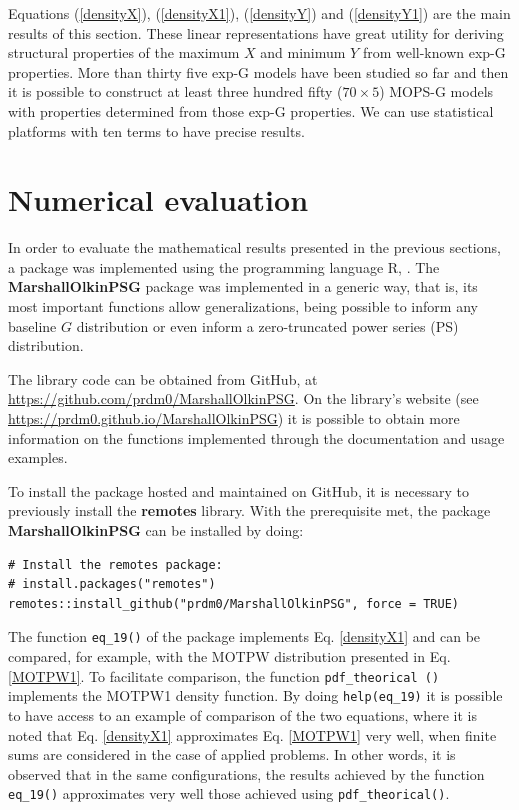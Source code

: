 \documentclass[12pt]{article}
\begin{document}
Equations (\ref{densityX}), (\ref{densityX1}), (\ref{densityY}) and (\ref{densityY1}) are the main results of this section.
These linear representations have great utility for deriving structural properties of the maximum $X$ and minimum $Y$ from well-known
exp-G properties. More than thirty five exp-G models have been studied
so far and then it is possible to construct at least three hundred fifty ($70 \times 5$) MOPS-G models with properties
determined from those exp-G properties. We can use statistical platforms with ten terms to have precise results.

\section{Numerical evaluation}

In order to evaluate the mathematical results presented in the previous sections, a package was implemented using the programming language R, \cite{rlang}. The \textbf{MarshallOlkinPSG} package was implemented in a generic way, that is, its most important functions allow generalizations, being possible to inform any baseline $G$ distribution or even inform a zero-truncated power series (PS) distribution. 

The library code can be obtained from GitHub, at \href{GitHub}{https://github.com/prdm0/MarshallOlkinPSG}. On the library's website (see \href{website}{https://prdm0.github.io/MarshallOlkinPSG}) it is possible to obtain more information on the functions implemented through the documentation and usage examples.

To install the package hosted and maintained on GitHub, it is necessary to previously install the \textbf{remotes} library. With the prerequisite met, the package \textbf{MarshallOlkinPSG} can be installed by doing:

\begin{lstlisting}
# Install the remotes package: 
# install.packages("remotes")
remotes::install_github("prdm0/MarshallOlkinPSG", force = TRUE)
\end{lstlisting}

The function \texttt{eq\_19()} of the package implements Eq. \ref{densityX1} and can be compared, for example, with the MOTPW distribution presented in Eq. \ref{MOTPW1}. To facilitate comparison, the function \texttt{pdf\_theorical ()} implements the MOTPW1 density function. By doing \texttt{help(eq\_19)} it is possible to have access to an example of comparison of the two equations, where it is noted that Eq. \ref{densityX1} approximates Eq. \ref{MOTPW1} very well, when finite sums are considered in the case of applied problems. In other words, it is observed that in the same configurations, the results achieved by the function \texttt{eq\_19()} approximates very well those achieved using \texttt{pdf\_theorical()}.
\end{document}
